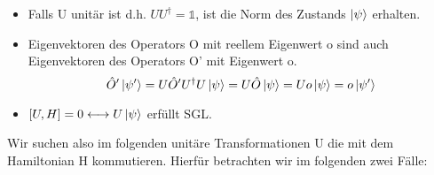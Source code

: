 \documentclass[Ex4_Zusammenfassung.tex]{subfiles}
\begin{document}
\begin{itemize}
\item Falls U unitär ist d.h. $U U^{\dag} = \mathds{1}$, ist die Norm des Zustands $\ket{\psi}$ erhalten.
\item Eigenvektoren des Operators O mit reellem Eigenwert o sind auch Eigenvektoren des Operators O' mit Eigenwert o.
\begin{equation}
\hat{O}' \ket{\psi'} = U \hat{O}'  U^{\dag} U \ket{\psi} = U \hat{O} \ket{\psi} = U o \ket{\psi} = o \ket{\psi'}
\end{equation}
\item $ [U,H] = 0 \longleftrightarrow U \ket{\psi}$ erfüllt SGL. 
\end{itemize}
Wir suchen also im folgenden unitäre Transformationen U die mit dem Hamiltonian H kommutieren. Hierfür betrachten wir im folgenden zwei Fälle:
\end{document}
